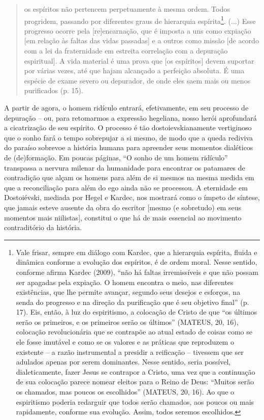 \begin{quote}
os espíritos não pertencem perpetuamente à mesma ordem. Todos progridem,
passando por diferentes graus de hierarquia espírita\footnote{Vale
  frisar, sempre em diálogo com Kardec, que a hierarquia espírita,
  fluida e dinâmica conforme a evolução dos espíritos, é de ordem moral.
  Nesse sentido, conforme afirma Kardec (2009), ``não há faltas
  irremissíveis e que não possam ser apagadas pela expiação. O homem
  encontra o meio, nas diferentes existências, que lhe permite avançar,
  segundo seus desejos e esforços, na senda do progresso e na direção da
  purificação que é seu objetivo final'' (p. 17). Eis, então, à luz do
  espiritismo, a colocação de Cristo de que ``os últimos serão os
  primeiros, e os primeiros serão os últimos'' (MATEUS, 20, 16),
  colocação revolucionária que se contrapõe ao atual estado de coisas
  como se ele fosse imutável e como se os valores e as práticas que
  reproduzem o existente -- a razão instrumental a presidir a reificação
  -- tivessem que ser adulados apenas por serem dominantes. Nesse
  sentido, seria possível, dialeticamente, fazer Jesus se contrapor a
  Cristo, uma vez que a continuação de sua colocação parece nomear
  eleitos para o Reino de Deus: ``Muitos serão os chamados, mas poucos
  os escolhidos'' (MATEUS, 20, 16). Ao que o espiritismo poderia
  redarguir que todos serão chamados, aos poucos ou mais rapidamente,
  conforme sua evolução. Assim, todos seremos escolhidos.}. (...) Esse
progresso ocorre pela {[}re{]}encarnação, que é imposta a uns como
expiação {[}em relação às faltas das vidas passadas{]} e a outros como
missão {[}de acordo com a lei da fraternidade em estreita correlação com
a depuração espiritual{]}. A vida material é uma prova que {[}os
espíritos{]} devem suportar por várias vezes, até que hajam alcançado a
perfeição absoluta. É uma espécie de exame severo ou depurador, de onde
eles saem mais ou menos purificados (p. 15).
\end{quote}

A partir de agora, o homem ridículo entrará, efetivamente, em seu
processo de depuração -- ou, para retomarmos a expressão hegeliana,
nosso herói aprofundará a cicatrização de seu espírito. O processo é tão
dostoievskianamente vertiginoso que o sonho fará o tempo sobrepujar a si
mesmo, de modo que a queda rediviva do paraíso sobrevoe a história
humana para apreender seus momentos dialéticos de (de)formação. Em
poucas páginas, ``O sonho de um homem ridículo'' transpassa a nervura
milenar da humanidade para encontrar os patamares de contradição que
alçam os homens para além de si mesmos na mesma medida em que a
reconciliação para além do ego ainda não se processou. A eternidade em
Dostoiévski, mediada por Hegel e Kardec, nos mostrará como o ímpeto de
síntese, que jamais esteve ausente da obra do escritor {[}mesmo (e
sobretudo) em seus momentos mais niilistas{]}, constitui o que há de
mais essencial ao movimento contraditório da história.

